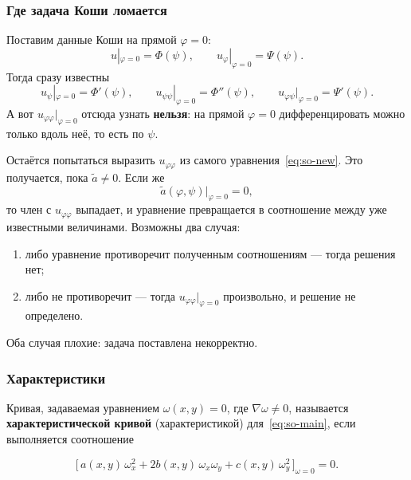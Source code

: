 \subsubsection*{Где задача Коши ломается}

Поставим данные Коши на прямой $\varphi = 0$:
\[
  u|_{\varphi=0} = \Phi(\psi), \qquad
  u_\varphi|_{\varphi=0} = \Psi(\psi) .
\]
Тогда сразу известны
\[
  u_\psi|_{\varphi=0} = \Phi'(\psi), \qquad
  u_{\psi\psi}|_{\varphi=0} = \Phi''(\psi), \qquad
  u_{\varphi\psi}|_{\varphi=0} = \Psi'(\psi) .
\]
А вот $u_{\varphi\varphi}|_{\varphi=0}$ отсюда узнать \textbf{нельзя}: на
прямой $\varphi = 0$ дифференцировать можно только вдоль неё, то есть по
$\psi$.


Остаётся попытаться выразить $u_{\varphi\varphi}$ из самого
уравнения~\eqref{eq:so-new}. Это получается, пока $\widetilde a \ne 0$. Если же
\[
  \widetilde a(\varphi,\psi)\big|_{\varphi=0} = 0 ,
\]
то член с $u_{\varphi\varphi}$ выпадает, и уравнение превращается в
соотношение между уже известными величинами. Возможны два случая:

\begin{enumerate}[label=\arabic*), leftmargin=2em]
  \item либо уравнение противоречит полученным соотношениям — тогда решения
        нет;
  \item либо не противоречит — тогда $u_{\varphi\varphi}|_{\varphi=0}$
        произвольно, и решение не определено.
\end{enumerate}

Оба случая плохие: задача поставлена некорректно.

\subsubsection*{Характеристики}

\begin{definition}
Кривая, задаваемая уравнением $\omega(x,y) = 0$, где $\nabla\omega \ne 0$,
называется \textbf{характеристической кривой} (характеристикой)
для~\eqref{eq:so-main}, если выполняется соотношение

\begin{equation}\tag{3}\label{eq:so-char}
  \Big[\, a(x,y)\,\omega_x^2 + 2b(x,y)\,\omega_x \omega_y
        + c(x,y)\,\omega_y^2 \,\Big]_{\omega = 0} = 0 .
\end{equation}
\end{definition}

